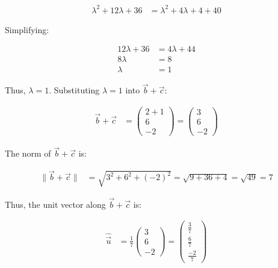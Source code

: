 \documentclass[journal]{IEEEtran}
\numberwithin{equation}{enumi}
\numberwithin{figure}{enumi}
\begin{document}
\begin{align}
\lambda^2 + 12\lambda + 36 &= \lambda^2 + 4\lambda + 4 + 40
\end{align}

Simplifying:

\begin{align}
12\lambda + 36 &= 4\lambda + 44 \\
8\lambda &= 8 \\
\lambda &= 1
\end{align}

Thus, $\lambda = 1$. Substituting $\lambda = 1$ into $\vec{b} + \vec{c}$:

\begin{align}
\vec{b} + \vec{c} &= \begin{pmatrix} 2 + 1 \\ 6 \\ -2 \end{pmatrix} = \begin{pmatrix} 3 \\ 6 \\ -2 \end{pmatrix}
\end{align}

The norm of $\vec{b} + \vec{c}$ is:

\begin{align}
\|\vec{b} + \vec{c}\| &= \sqrt{3^2 + 6^2 + (-2)^2} = \sqrt{9 + 36 + 4} = \sqrt{49} = 7
\end{align}

Thus, the unit vector along $\vec{b} + \vec{c}$ is:

\begin{align}
\hat{\vec{u}} &= \frac{1}{7} \begin{pmatrix} 3 \\ 6 \\ -2 \end{pmatrix} = \begin{pmatrix} \frac{3}{7} \\ \frac{6}{7} \\ \frac{-2}{7} \end{pmatrix}
\end{align}
\end{document}

